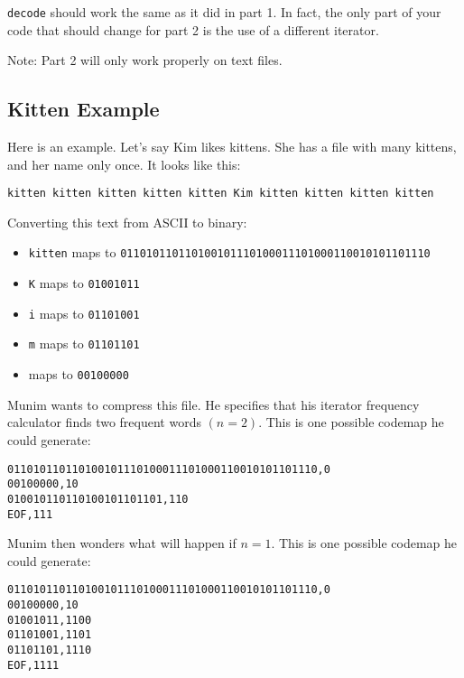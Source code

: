 \documentclass[11pt]{article}
\begin{document}
\texttt{decode} should work the same as it did in part 1. In fact, the only part of your code that should change for part 2 is the use of a different iterator.

Note: Part 2 will only work properly on text files.

\subsection*{Kitten Example}
Here is an example. Let's say Kim likes kittens. She has a file with many kittens, and her name only once. It looks like this:

\begin{center}
\texttt{kitten kitten kitten kitten kitten Kim kitten kitten kitten kitten}
\end{center}
Converting this text from ASCII to binary:
\begin{itemize}
\item \texttt{kitten} maps to \texttt{011010110110100101110100011101000110010101101110}
\item \texttt{K} maps to \texttt{01001011}
\item \texttt{i} maps to \texttt{01101001}
\item \texttt{m} maps to \texttt{01101101}
\item \texttt{\textvisiblespace} maps to \texttt{00100000}
\end{itemize}
\vspace{0.3cm}
Munim wants to compress this file. He specifies that his iterator frequency calculator finds two frequent words $(n=2)$. This is one possible codemap he could generate:

\texttt{011010110110100101110100011101000110010101101110,0\\
00100000,10\\
010010110110100101101101,110\\
EOF,111}

\vspace{0.3cm}
Munim then wonders what will happen if $n=1$. This is one possible codemap he could generate:

\texttt{011010110110100101110100011101000110010101101110,0\\
00100000,10\\
01001011,1100\\
01101001,1101\\
01101101,1110\\
EOF,1111}

\newpage
\end{document}
